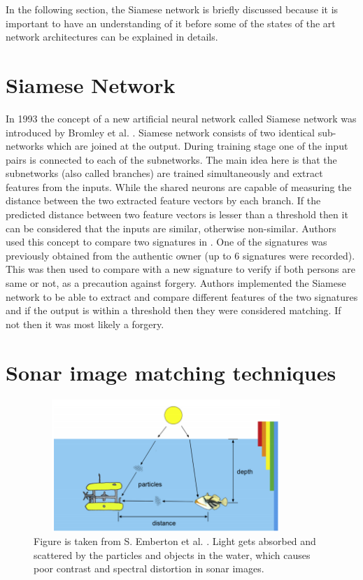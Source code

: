In the following section, the Siamese network is briefly discussed because it is important to have an understanding of it before some of the states of the art network architectures can be explained in details. 

\section{Siamese Network}
In 1993 the concept of a new artificial neural network called Siamese network was introduced by Bromley et al. \cite{bromley1994signature}. Siamese network consists of two identical sub-networks which are joined at the output.
During training stage one of the input pairs is connected to each of the subnetworks. The main idea here is that the subnetworks (also called branches) are trained simultaneously and extract features from the inputs.
While the shared neurons are capable of measuring the distance between the two extracted feature vectors by each branch. If the predicted distance between two feature vectors is lesser than a threshold then it can be considered that the inputs are similar, otherwise non-similar. Authors used this concept to compare two signatures in \cite{bromley1994signature}. One of the signatures was previously obtained from the authentic owner (up to 6 signatures were recorded). 
This was then used to compare with a new signature to verify if both persons are same or not, as a precaution against forgery. 
Authors implemented the Siamese network to be able to extract and compare different features of the two signatures and if the output is within a threshold then
they were considered matching. If not then it was most likely a forgery. 

\section{Sonar image matching techniques}

\begin{figure}[ht]
\centering
\includegraphics[width=10cm,height=5cm]{images/densenet/siamese/sonar_diagram}
\caption{Figure is taken from S. Emberton et al. \cite{emberton2018underwater}. Light gets absorbed and scattered by the particles and objects in the water, which causes poor contrast and spectral distortion in sonar images.}
\label{fig:sonar_diagram}
\end{figure}

